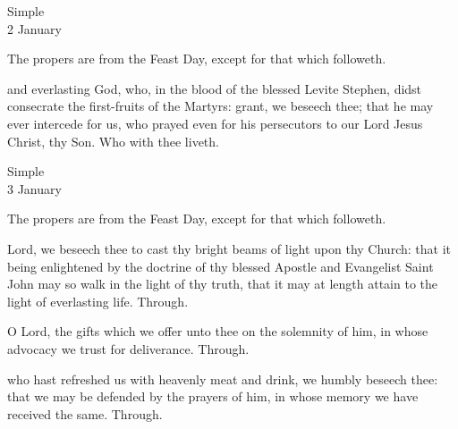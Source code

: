 

\begin{inhead}
    {Simple\\
2 January}
\end{inhead}

\begin{rubric}
	The propers are from the Feast Day, except for that which followeth.
\end{rubric}

\collect
{} and everlasting God, who, in the blood of the blessed Levite Stephen, didst consecrate the first-fruits of the Martyrs: grant, we beseech thee; that he may ever intercede for us, who prayed even for his persecutors to our Lord Jesus Christ, thy Son. Who with thee liveth.

\begin{inhead}
    {Simple\\
3 January}
\end{inhead}

\begin{rubric}
	The propers are from the Feast Day, except for that which followeth.
\end{rubric}


\collect
{} Lord, we beseech thee to cast thy bright beams of light upon thy Church: that it being enlightened by the doctrine of thy blessed Apostle and Evangelist Saint John may so walk in the light of thy truth, that it may at length attain to the light of everlasting life. Through.

\secret
{} O Lord, the gifts which we offer unto thee on the solemnity of him, in whose advocacy we trust for deliverance. Through.

\postcommunion
{} who hast refreshed us with heavenly meat and drink, we humbly beseech thee: that we may be defended by the prayers of him, in whose memory we have received the same. Through.


